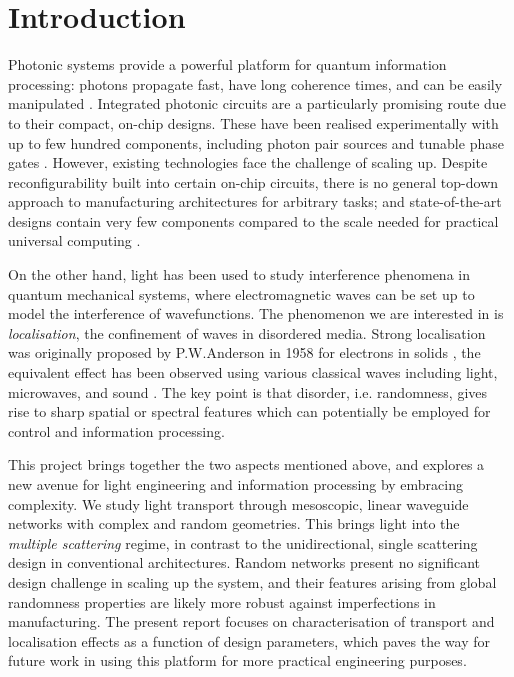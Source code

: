 \chapter{Introduction}
Photonic systems provide a powerful platform for quantum information processing: photons propagate fast, have long coherence times, and can be easily manipulated \cite{Flamini2018}. Integrated photonic circuits are a particularly promising route due to their compact, on-chip designs. These have been realised experimentally with up to few hundred components, including photon pair sources and tunable phase gates \cite{Harris2017,Shadbolt2012a,Wang2018}.
However, existing technologies face the challenge of scaling up. Despite reconfigurability built into certain on-chip circuits, there is no general top-down approach to manufacturing architectures for arbitrary tasks; and state-of-the-art designs contain very few components compared to the scale needed for practical universal computing \cite{Flamini2018}. 

On the other hand, light has been used to study interference phenomena in quantum mechanical systems, where electromagnetic waves can be set up to model the interference of wavefunctions. The phenomenon we are interested in is \textit{localisation}, the confinement of waves in disordered media. Strong localisation was originally proposed by P.W.Anderson in 1958 for electrons in solids \cite{Anderson1958}, the equivalent effect has been observed using various classical waves including light, microwaves, and sound \cite{Lagendijk2009}. The key point is that disorder, i.e. randomness, gives rise to sharp spatial or spectral features which can potentially be employed for control and information processing.

This project brings together the two aspects mentioned above, and explores a new avenue for light engineering and information processing by embracing complexity. We study light transport through mesoscopic, linear waveguide networks with complex and random geometries. This brings light into the \textit{multiple scattering} regime, in contrast to the unidirectional, single scattering design in conventional architectures. Random networks present no significant design challenge in scaling up the system, and their features arising from global randomness properties are likely more robust against imperfections in manufacturing. The present report focuses on characterisation of transport and localisation effects as a function of design parameters, which paves the way for future work in using this platform for more practical engineering purposes. 

